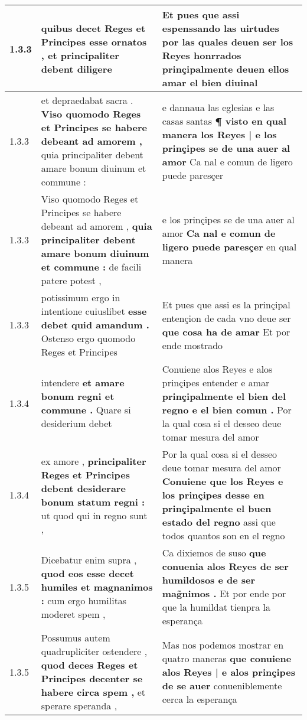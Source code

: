 \begin{tabular}{|p{1cm}|p{6.5cm}|p{6.5cm}|}
1.3.3 & quibus decet Reges \textbf{ et Principes esse ornatos , } et principaliter debent diligere & Et pues que assi espenssando las uirtudes \textbf{ por las quales deuen ser los Reyes honrrados } prinçipalmente deuen ellos amar el bien diuinal \\\hline
1.3.3 & et depraedabat sacra . \textbf{ Viso quomodo Reges et Principes se habere debeant ad amorem , } quia principaliter debent amare bonum diuinum et commune : & e dannaua las eglesias e las casas santas \textbf{ ¶ visto en qual manera los Reyes | e los prinçipes se de una auer al amor } Ca nal e comun de ligero puede paresçer \\\hline
1.3.3 & Viso quomodo Reges et Principes se habere debeant ad amorem , \textbf{ quia principaliter debent amare bonum diuinum et commune : } de facili patere potest , & e los prinçipes se de una auer al amor \textbf{ Ca nal e comun de ligero puede paresçer } en qual manera \\\hline
1.3.3 & potissimum ergo in intentione cuiuslibet \textbf{ esse debet quid amandum . } Ostenso ergo quomodo Reges et Principes & Et pues que assi es la prinçipal entençion de cada vno deue ser \textbf{ que cosa ha de amar } Et por ende mostrado \\\hline
1.3.4 & intendere \textbf{ et amare bonum regni et commune . } Quare si desiderium debet & Conuiene alos Reyes e alos prinçipes entender e amar \textbf{ prinçipalmente el bien del regno e el bien comun . } Por la qual cosa si el desseo deue tomar mesura del amor \\\hline
1.3.4 & ex amore , \textbf{ principaliter Reges et Principes debent desiderare bonum statum regni : } ut quod qui in regno sunt , & Por la qual cosa si el desseo deue tomar mesura del amor \textbf{ Conuiene que los Reyes e los prinçipes desse en prinçipalmente el buen estado del regno } assi que todos quantos son en el regno \\\hline
1.3.5 & Dicebatur enim supra , \textbf{ quod eos esse decet humiles et magnanimos : } cum ergo humilitas moderet spem , & Ca dixiemos de suso \textbf{ que conuenia alos Reyes de ser humildosos e de ser mag̃nimos . } Et por ende por que la humildat tienpra la esperança \\\hline
1.3.5 & Possumus autem quadrupliciter ostendere , \textbf{ quod deces Reges et Principes decenter se habere circa spem , } et sperare speranda , & Mas nos podemos mostrar en quatro maneras \textbf{ que conuiene alos Reyes | e alos prinçipes de se auer } conueniblemente cerca la esperança \\\hline

\end{tabular}
